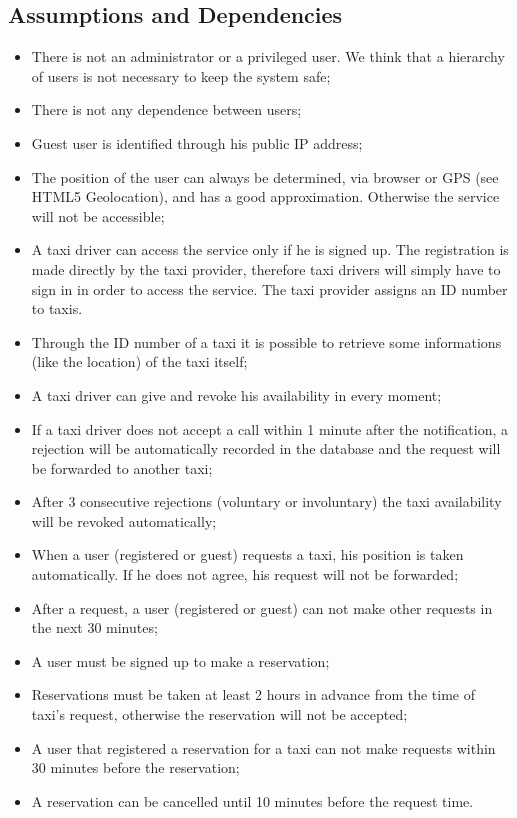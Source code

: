 	\subsection{Assumptions and Dependencies}
		\begin{itemize}
			\item There is not an administrator or a privileged user. We think that a hierarchy of users is not
			necessary to keep the system safe;
			\item There is not any dependence between users;
			\item Guest user is identified through his public IP address;
			\item The position of the user can always be determined, via browser or GPS
			(see HTML5 Geolocation), and has a good approximation. Otherwise the service will not
			be accessible;
			\item A taxi driver can access the service only if he is signed up. The registration is made directly by the taxi 
			provider, therefore taxi drivers will simply have to sign in in order to access the service. The taxi provider
			assigns an ID number to taxis.
			\item Through the ID number of a taxi it is possible to retrieve some informations (like
			the location) of the taxi itself;
			\item A taxi driver can give and revoke his availability in every moment;
			\item If a taxi driver does not accept a call within 1 minute after the notification,
			a rejection will be automatically recorded in the database and the request will be
			forwarded to another taxi;
			\item After 3 consecutive rejections (voluntary or involuntary) the taxi availability
			will be revoked automatically;
			\item When a user (registered or guest) requests a taxi, his position is taken automatically.
			If he does not agree, his request will not be forwarded;
			\item After a request, a user (registered or guest) can not make other requests in the next 30 minutes;
			\item A user must be signed up to make a reservation;
			\item Reservations must be taken at least 2 hours in advance from the time of taxi's request,
			otherwise the reservation will not be accepted;
			\item A user that registered a reservation for a taxi can not make requests within 30 minutes
			before the reservation;
			\item A reservation can be cancelled until 10 minutes before the request time.
		\end{itemize}
